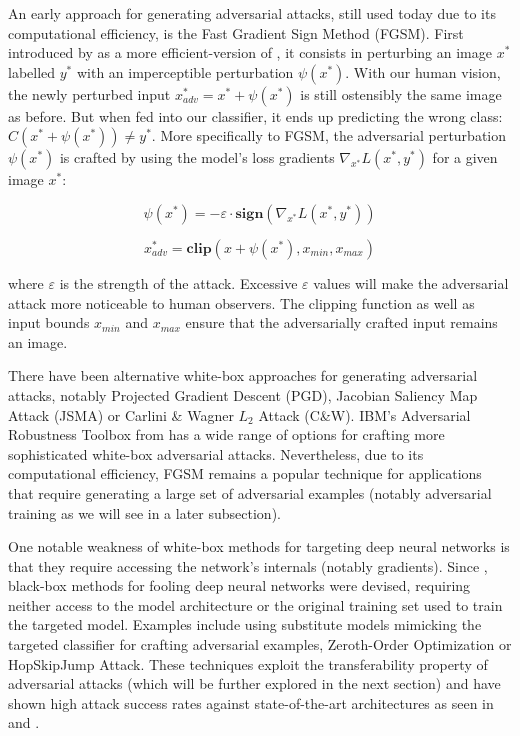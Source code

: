 An early approach for generating adversarial attacks, still used today due to its computational efficiency, is the Fast Gradient Sign Method (FGSM). First introduced by \cite{Goodfellow2014} as a more efficient-version of \cite{Szegedy2014}, it consists in perturbing an image $x^{*}$ labelled $y^{*}$ with an imperceptible perturbation $\psi(x^{*})$. With our human vision, the newly perturbed input $x_{adv}^{*} = x^{*} + \psi(x^{*})$ is still ostensibly the same image as before. But when fed into our classifier, it ends up predicting the wrong class: $C(x^{*} + \psi(x^{*})) \neq y^{*}$. More specifically to FGSM, the adversarial perturbation $\psi(x^{*})$ is crafted by using the model's loss gradients $\nabla_{x^{*}} L(x^{*},y^{*})$ for a given image $x^{*}$:

$$ \psi(x^{*}) = - \varepsilon \cdot \mathbf{sign}(\nabla_{x^{*}} L(x^{*},y^{*})) $$

$$ x_{adv}^{*} = \mathbf{clip}(x + \psi(x^{*}), x_{min}, x_{max} )$$

where $\varepsilon$ is the strength of the attack. Excessive $\varepsilon$ values will make the adversarial attack more noticeable to human observers. The clipping function as well as input bounds $x_{min}$ and $x_{max}$ ensure that the adversarially crafted input remains an image.

There have been alternative white-box approaches for generating adversarial attacks, notably Projected Gradient Descent (PGD), Jacobian Saliency Map Attack (JSMA) or Carlini \& Wagner $L_2$ Attack (C\&W). IBM's Adversarial Robustness Toolbox from \cite{Nicolae2018AdversarialRT} has a wide range of options for crafting more sophisticated white-box adversarial attacks. Nevertheless, due to its computational efficiency, FGSM remains a popular technique for applications that require generating a large set of adversarial examples (notably adversarial training as we will see in a later subsection).

One notable weakness of white-box methods for targeting deep neural networks is that they require accessing the network's internals (notably gradients). Since \cite{Papernot2017PracticalBA}, black-box methods for fooling deep neural networks were devised, requiring neither access to the model architecture or the original training set used to train the targeted model. Examples include using substitute models mimicking the targeted classifier for crafting adversarial examples, Zeroth-Order Optimization or HopSkipJump Attack. These techniques exploit the transferability property of adversarial attacks (which will be further explored in the next section) and have shown high attack success rates against state-of-the-art architectures as seen in \cite{Papernot2017PracticalBA} and \cite{Chen2017ZOOZO}.



